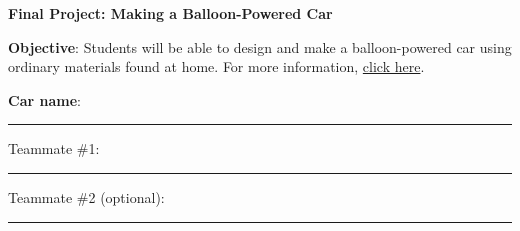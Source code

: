 \documentclass{article}
\begin{document}
\thispagestyle{empty}

\begin{center}
    \textbf{Final Project: Making a Balloon-Powered Car}
\end{center}

\textbf{Objective}: Students will be able to design and make a balloon-powered car using ordinary materials found at home. For more information, \href{https://www.sciencebuddies.org/science-fair-projects/project-ideas/Phys_p099/physics/balloon-powered-car-challenge}{click here}.
\vspace{1em}

\textbf{Car name}: \rule{2in}{0.15mm}
\vspace{1em}

Teammate \#1: \rule{2in}{0.15mm} \hspace{2em}
Teammate \#2 (optional): \rule{2in}{0.15mm}
\vspace{1em}
\end{document}
